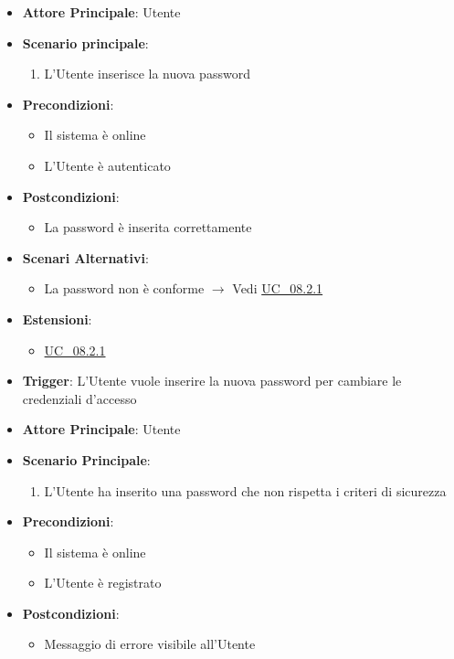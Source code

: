 \begin{itemize}
    \item \textbf{Attore Principale}: Utente
    \item \textbf{Scenario principale}:
        \begin{enumerate}
            \item L'Utente inserisce la nuova password
        \end{enumerate}
    \item \textbf{Precondizioni}:
        \begin{itemize}
            \item Il sistema è online
            \item L'Utente è autenticato
        \end{itemize}
    \item \textbf{Postcondizioni}:
        \begin{itemize}
            \item La password è inserita correttamente
        \end{itemize}
    \item \textbf{Scenari Alternativi}:
        \begin{itemize}
            \item La password non è conforme $\rightarrow$ Vedi \hyperref[uc_08.2.1]{UC\_08.2.1}
        \end{itemize}
    \item \textbf{Estensioni}:
        \begin{itemize}
            \item \hyperref[uc_08.2.1]{UC\_08.2.1}
        \end{itemize}
    \item \textbf{Trigger}: L'Utente vuole inserire la nuova password per cambiare le credenziali d'accesso
\end{itemize}

\label{uc_08.2.1}

\begin{itemize}
    \item \textbf{Attore Principale}: Utente
    \item \textbf{Scenario Principale}:
    \begin{enumerate}
        \item L'Utente ha inserito una password che non rispetta i criteri di sicurezza
    \end{enumerate}
    \item \textbf{Precondizioni}:
    \begin{itemize}
        \item Il sistema è online
        \item L'Utente è registrato
    \end{itemize}
    \item \textbf{Postcondizioni}:
    \begin{itemize}
        \item Messaggio di errore visibile all'Utente
    \end{itemize}
\end{itemize}

